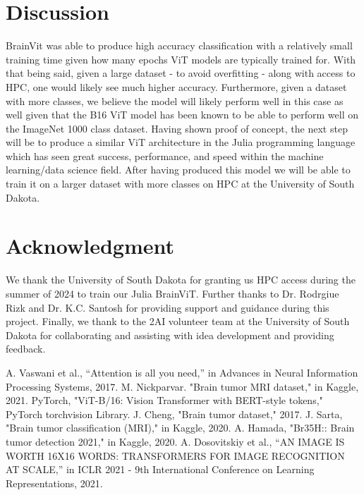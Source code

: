 \documentclass[conference]{IEEEtran}
\begin{document}
\section{Discussion}
BrainVit was able to produce high accuracy classification with a relatively small training time given how many epochs ViT models are typically trained for. With that being said, given a large dataset - to avoid overfitting - along with access to HPC, one would likely see much higher accuracy. Furthermore, given a dataset with more classes, we believe the model will likely perform well in this case as well given that the B16 ViT model has been known to be able to perform well on the ImageNet 1000 class dataset.
Having shown proof of concept, the next step will be to produce a similar ViT architecture in the Julia programming language which has seen great success, performance, and speed within the machine learning/data science field. After having produced this model we will be able to train it on a larger dataset with more classes on HPC at the University of South Dakota.

\section*{Acknowledgment}
We thank the University of South Dakota for granting us HPC access during the summer of 2024 to train our Julia BrainViT. Further thanks to Dr. Rodrgiue Rizk and Dr. K.C. Santosh for providing support and guidance during this project. Finally, we thank to the 2AI volunteer team at the University of South Dakota for collaborating and assisting with idea development and providing feedback.

\begin{thebibliography}{00}
 A. Vaswani et al., “Attention is all you need,” in Advances in Neural Information Processing Systems, 2017.
 M. Nickparvar. "Brain tumor MRI dataset," in Kaggle, 2021. 
 PyTorch, "ViT-B/16: Vision Transformer with BERT-style tokens," PyTorch torchvision Library.
 J. Cheng, "Brain tumor dataset," 2017.
 J. Sarta, "Brain tumor classification (MRI)," in Kaggle, 2020.
 A. Hamada, "Br35H:: Brain tumor detection 2021," in Kaggle, 2020.
 A. Dosovitskiy et al., “AN IMAGE IS WORTH 16X16 WORDS: TRANSFORMERS FOR IMAGE RECOGNITION AT SCALE,” in ICLR 2021 - 9th International Conference on Learning Representations, 2021.
\end{thebibliography}
\end{document}
